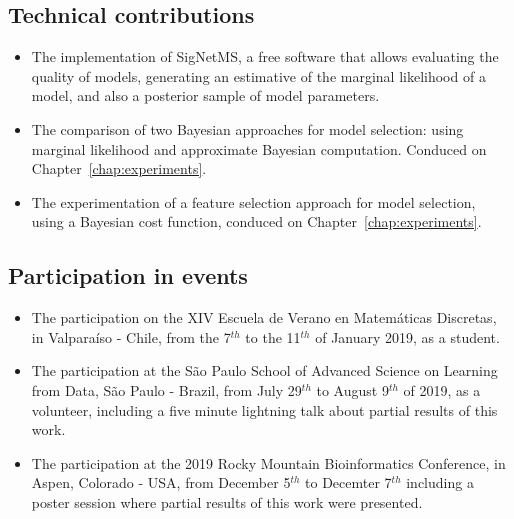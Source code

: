 \subsection{Technical contributions}
\begin{itemize}
\item{The implementation of SigNetMS, a free software that allows
    evaluating the quality of models, generating an estimative of the
    marginal likelihood of a model, and also a posterior sample of model
    parameters.}
\item{The comparison of two Bayesian approaches for model selection:
    using marginal likelihood and approximate Bayesian computation.
    Conduced on Chapter~\ref{chap:experiments}.}
\item{The experimentation of a feature selection approach for model
    selection, using a Bayesian cost function, conduced on
    Chapter~\ref{chap:experiments}.}
\end{itemize}

\subsection{Participation in events}
\begin{itemize}
\item{The participation on the XIV Escuela de Verano en Matemáticas
    Discretas, in Valparaíso - Chile, from the 7$^{th}$ to the
    11$^{th}$ of January 2019, as a student.}
\item{The participation at the São Paulo School of Advanced Science on 
    Learning from Data, São Paulo - Brazil, from July 29$^{th}$ to
    August 9$^{th}$ of 2019, as a volunteer, including a 
    five minute lightning talk about partial results of this work.}
\item{The participation at the 2019 Rocky Mountain Bioinformatics 
    Conference, in Aspen, Colorado - USA, from December 5$^{th}$ to
    Decemter 7$^{th}$ including a poster session where partial results 
    of this work were presented.}
\end{itemize}

